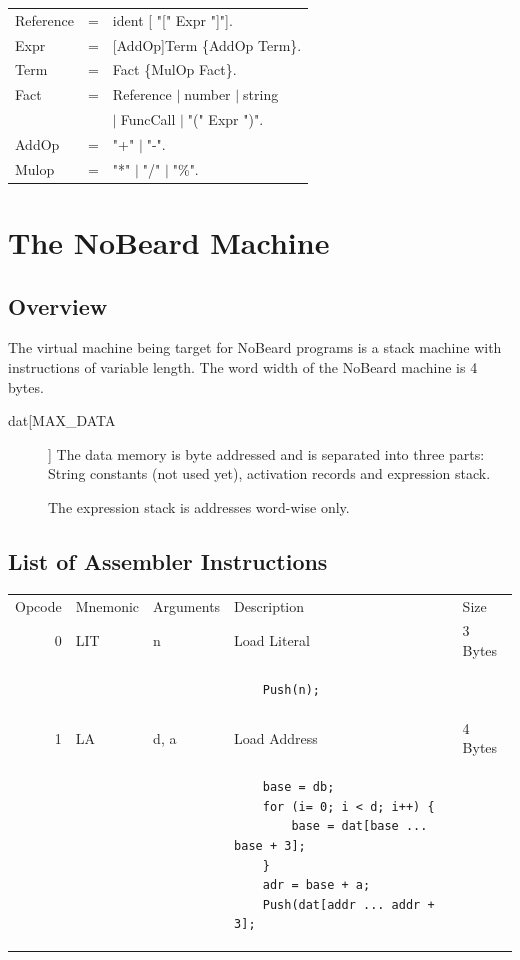 \documentclass[11pt]{report}
\newcommand{\leongage}{NoBeard}
\newenvironment{grammar}
	{\begin{tabular}[b]{lcl}}
	{\end{tabular}}
\newcommand{\alternative}{$\mid \;$}
\begin{document}
\begin{grammar}
	Reference & = & ident [ "[" Expr "]"]. \\
	
	Expr & = & [AddOp]Term \{AddOp Term\}. \\
	
	Term & = & Fact \{MulOp Fact\}. \\
	
	Fact & = & Reference \alternative number \alternative string \\
	&& \alternative FuncCall \alternative "(" Expr ")". \\
	
	AddOp & = & "+" \alternative "-". \\
	
	Mulop & = & "*" \alternative "/" \alternative "\%".
	
	\end{grammar}

\chapter{The \leongage{} Machine}
\section{Overview}
The virtual machine being target for \leongage{} programs is a stack machine with instructions of variable length. The word
width of the \leongage{} machine is 4 bytes.

\begin{description}
	\item[dat[MAX\_DATA]] The data memory is byte addressed and is separated into three parts: String constants (not used yet),
	activation records and expression stack.
	
	The expression stack is addresses word-wise only.
\end{description}

\section{List of Assembler Instructions}
\lstset{language=[x86masm]Assembler, tabsize=2}

\begin{tabular}{rllll}
	Opcode & Mnemonic & Arguments & Description & Size \\
	0 & LIT & n & Load Literal & 3 Bytes \\
	&&&\begin{lstlisting}
	Push(n);
	\end{lstlisting}\\
	1 & LA & d, a & Load Address & 4 Bytes\\
	&&&\begin{lstlisting}
	base = db;
	for (i= 0; i < d; i++) {
		base = dat[base ... base + 3];
	}
	adr = base + a;
	Push(dat[addr ... addr + 3];
	\end{lstlisting}
\end{tabular}
\end{document}
